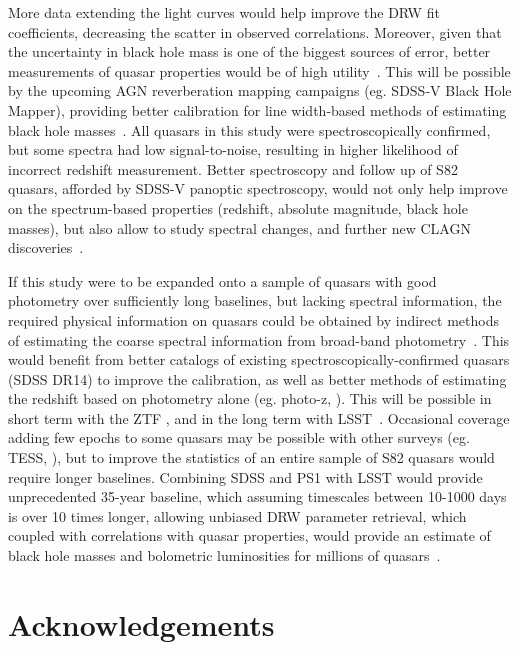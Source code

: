 \documentclass[twocolumn]{aastex62}
\begin{document}
More data extending the light curves would help improve the DRW fit coefficients, decreasing the scatter in observed correlations. Moreover, given that the uncertainty in black hole mass is one of the biggest sources of error, better measurements of quasar properties would be of high utility~\citep{shen2011}.  This will be possible by the upcoming AGN reverberation mapping campaigns (eg. SDSS-V Black Hole Mapper), providing better calibration for line width-based methods of estimating black hole masses~\citep{kollmeier2017}. All quasars in this study were spectroscopically confirmed, but some spectra had low signal-to-noise, resulting in higher likelihood of incorrect redshift measurement. Better spectroscopy and follow up of S82 quasars, afforded by SDSS-V panoptic spectroscopy, would not only help improve on the spectrum-based  properties (redshift, absolute magnitude, black hole masses), but also allow to study spectral changes, and further new CLAGN discoveries~\citep{macleod2019}. 

If this study were to be expanded onto a sample of quasars with good photometry over sufficiently long baselines, but lacking spectral information, the required physical information on quasars could be obtained by indirect methods of estimating the coarse spectral information from broad-band photometry~\citep{kozlowski2015}. This would benefit from better catalogs of existing spectroscopically-confirmed quasars (SDSS DR14) to improve the calibration, as well as better methods of estimating the redshift based on photometry alone (eg. photo-z, \citealt{graham2018}).  This will be possible in short term with the ZTF \citep{bellm2018}, and in the long term with LSST~\citep{ivezic2019}. Occasional coverage adding few epochs to some quasars may be possible with other surveys (eg. TESS, \citealt{ricker2014}), but to improve the statistics of an entire sample of S82 quasars would require longer baselines. Combining SDSS and PS1 with LSST would provide unprecedented 35-year baseline, which assuming timescales between 10-1000 days is over 10 times longer, allowing unbiased DRW parameter retrieval, which coupled with correlations with quasar properties, would provide an estimate of black hole masses and bolometric luminosities for millions of quasars~\citep{ivezic2019}. 


\section{Acknowledgements}
\end{document}
